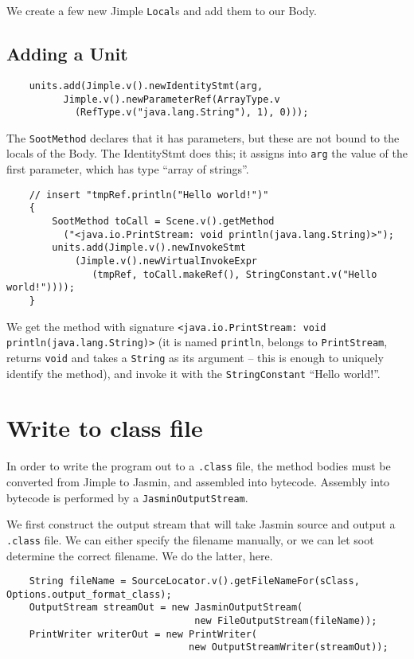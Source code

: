 \documentclass{article}
\begin{document}
We create a few new Jimple {\tt Local}s and add them to our Body.

\subsection{Adding a Unit}

\begin{verbatim}
    units.add(Jimple.v().newIdentityStmt(arg, 
          Jimple.v().newParameterRef(ArrayType.v
            (RefType.v("java.lang.String"), 1), 0)));
\end{verbatim}

The {\tt SootMethod} declares that it has parameters, but these are not
bound to the locals of the Body.  The IdentityStmt does this; it assigns
into {\tt arg} the value of the first parameter, which has type ``array of
strings''.

\begin{verbatim}
    // insert "tmpRef.println("Hello world!")"
    {
        SootMethod toCall = Scene.v().getMethod
          ("<java.io.PrintStream: void println(java.lang.String)>");
        units.add(Jimple.v().newInvokeStmt
            (Jimple.v().newVirtualInvokeExpr
               (tmpRef, toCall.makeRef(), StringConstant.v("Hello world!"))));
    }
\end{verbatim}                      

We get the method with signature 
{\tt <java.io.PrintStream: void println(java.lang.String)>}
(it is named {\tt println}, belongs to {\tt PrintStream}, returns 
{\tt void} and
takes a {\tt String} as its argument -- this is enough to uniquely
identify the method), and invoke it with the {\tt StringConstant} 
``Hello world!''.

\section{Write to class file}

In order to write the program out to a {\tt .class} file, the method bodies 
must be converted from Jimple to Jasmin, and assembled into bytecode. Assembly 
into bytecode is performed by a {\tt JasminOutputStream}.

We first construct the output stream that will take Jasmin source and output a 
{\tt .class} file. We can either specify the filename manually, or we can let 
soot determine the correct filename. We do the latter, here.

\begin{verbatim}
    String fileName = SourceLocator.v().getFileNameFor(sClass, Options.output_format_class);
    OutputStream streamOut = new JasminOutputStream(
                                 new FileOutputStream(fileName));
    PrintWriter writerOut = new PrintWriter(
                                new OutputStreamWriter(streamOut));
\end{verbatim}
\end{document}
